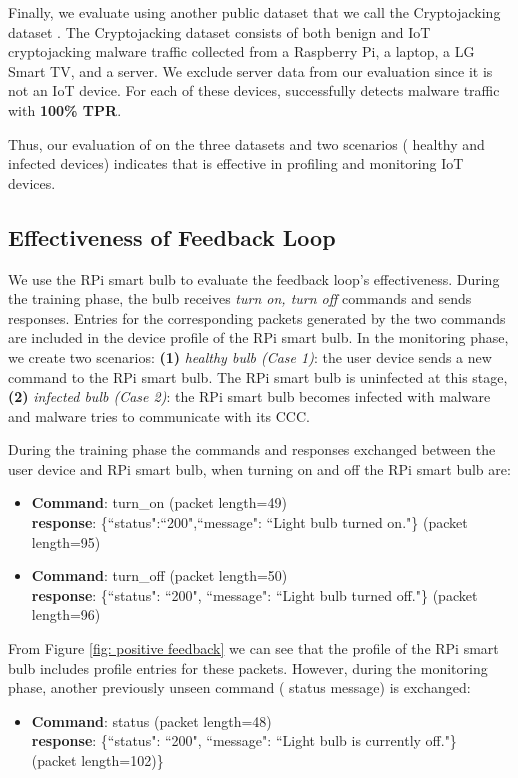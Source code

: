 Finally, we evaluate \system{} using another public dataset that we call the Cryptojacking dataset \cite{tekiner2022lightweight}. The Cryptojacking dataset consists of both benign and IoT cryptojacking malware traffic collected from a Raspberry Pi, a laptop, a LG Smart TV, and a server. We exclude server data from our evaluation since it is not an IoT device.  
For each of these devices, \system{} successfully detects malware traffic with \textbf{100\% TPR}. 

Thus, our evaluation of \system{} on the three datasets and two scenarios (\ie{} healthy and infected devices) indicates that \system is effective in profiling and monitoring IoT devices.

\subsection{Effectiveness of Feedback Loop}\label{subsec:effectiveness-feedback-loop}
We use the RPi smart bulb to evaluate the feedback loop's effectiveness.
During the training phase, the bulb receives \textit{turn on, turn off} commands and sends responses. Entries for the corresponding packets generated by the two commands are included in the device profile of the RPi smart bulb. In the monitoring phase, we create two scenarios: \textbf{(1)} \textit{healthy bulb (Case 1)}: the user device sends a new command to the RPi smart bulb. The RPi smart bulb is uninfected at this stage, \textbf{(2)} \textit{infected bulb (Case 2)}: the RPi smart bulb becomes infected with malware and malware tries to communicate with its CCC.

During the training phase the commands and responses exchanged between the user device and RPi smart bulb, when turning on and off the RPi smart bulb are:  
\begin{itemize}
    \item \textbf{Command}: turn\_on (packet length=49) \\ \textbf{response}: \{``status":``200",``message": ``Light bulb turned on."\}  (packet length=95)
    \item \textbf{Command}: turn\_off (packet length=50) \\ \textbf{response}: \{``status": ``200", ``message": ``Light bulb turned off."\}  (packet length=96)
\end{itemize}
From Figure \ref{fig: positive feedback} we can see that the profile of the RPi smart bulb includes profile entries for these packets. However, during the monitoring phase, another previously unseen command (\ie{} status message) is exchanged:
\begin{itemize}
    \item \textbf{Command}: status (packet length=48) \\ \textbf{response}: \{``status": ``200", ``message": ``Light bulb is currently off."\} \\ (packet length=102)\}
\end{itemize}

